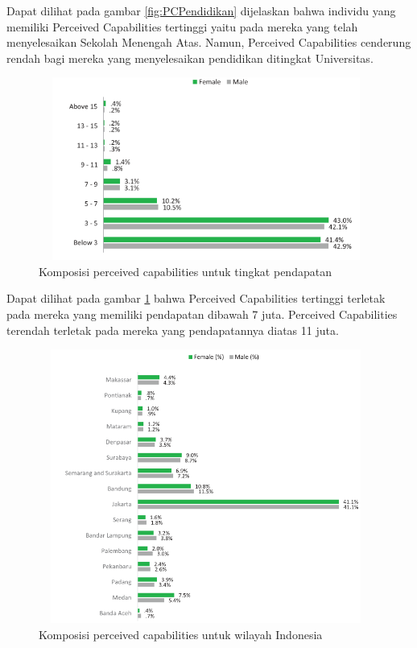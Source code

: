 Dapat dilihat pada gambar \ref{fig:PCPendidikan} dijelaskan bahwa individu yang memiliki Perceived Capabilities tertinggi yaitu pada mereka yang telah menyelesaikan Sekolah Menengah Atas. Namun, Perceived Capabilities cenderung rendah bagi mereka yang menyelesaikan pendidikan ditingkat Universitas.

\begin{figure} [H]
	\centering  
	\includegraphics[width=11cm, height=6cm]{pendapatanPC2013} 
	\caption[Komposisi perceived capabilities untuk tingkat pendapatan]{Komposisi perceived capabilities untuk tingkat pendapatan} 
	\label{fig:PCPendapatan} 
\end{figure}


Dapat dilihat pada gambar \ref{fig:PCPendapatan} bahwa Perceived Capabilities tertinggi terletak pada mereka yang memiliki pendapatan dibawah 7 juta. Perceived Capabilities terendah terletak pada mereka yang pendapatannya diatas 11 juta.


\begin{figure} [H]
	\centering  
	\includegraphics[width=11cm, height=9cm]{lokasiPC2013} 
	\caption[Komposisi perceived capabilities untuk wilayah Indonesia]{Komposisi perceived capabilities untuk wilayah Indonesia} 
	\label{fig:PCRegion} 
\end{figure}


